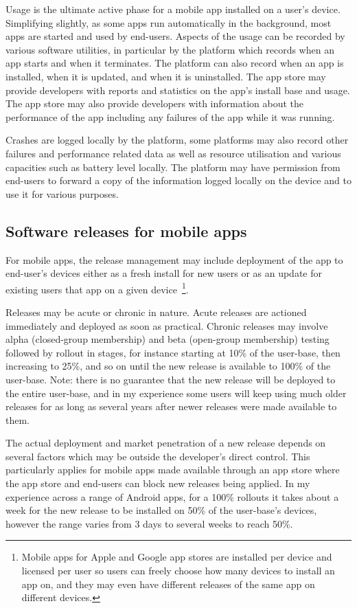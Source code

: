 Usage is the ultimate active phase for a mobile app installed on a user's device. Simplifying slightly, as some apps run automatically in the background, most apps are started and used by end-users. Aspects of the usage can be recorded by various software utilities, in particular by the platform which records when an app starts and when it terminates. The platform can also record when an app is installed, when it is updated, and when it is uninstalled. The app store may provide developers with reports and statistics on the app's install base and usage. The app store may also provide developers with information about the performance of the app including any failures of the app while it was running.

Crashes are logged locally by the platform, some platforms may also record other failures and performance related data as well as resource utilisation and various capacities such as battery level locally. The platform may have permission from end-users to forward a copy of the information logged locally on the device and to use it for various purposes.  

\subsection{Software releases for mobile apps}
For mobile apps, the release management may include deployment of the app to end-user's devices either as a fresh install for new users or as an update for existing users that app on a given device~\footnote{Mobile apps for Apple and Google app stores are installed per device and licensed per user so users can freely choose how many devices to install an app on, and they may even have different releases of the same app on different devices.}.

Releases may be acute or chronic in nature. Acute releases are actioned immediately and deployed as soon as practical. Chronic releases may involve alpha (closed-group membership) and beta (open-group membership) testing followed by rollout in stages, for instance starting at 10\% of the user-base, then increasing to 25\%, and so on until the new release is available to 100\% of the user-base. Note: there is no guarantee that the new release will be deployed to the entire user-base, and in my experience some users will keep using much older releases for as long as several years after newer releases were made available to them. 

The actual deployment and market penetration of a new release depends on several factors which may be outside the developer's direct control. This particularly applies for mobile apps made available through an app store where the app store and end-users can block new releases being applied. In my experience across a range of Android apps, for a 100\% rollouts it takes about a week for the new release to be installed on 50\% of the user-base's devices, however the range varies from 3 days to several weeks to reach 50\%.  

